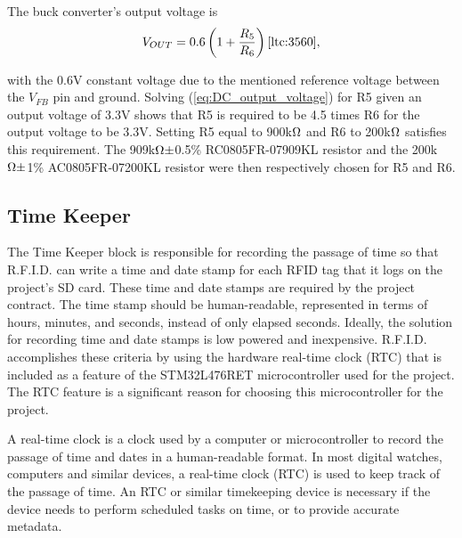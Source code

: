 
The buck converter's output voltage is
\begin{equation}
\label{eq:DC_output_voltage}
    V_{OUT} = 0.6\left(1+\frac{R_{5}}{R_{6}}\right) \cite{ltc:3560},
\end{equation}

with the 0.6V constant voltage due to the mentioned reference voltage between the $V_{FB}$ pin and ground. Solving (\ref{eq:DC_output_voltage}) for R5 given an output voltage of 3.3V shows that R5 is required to be 4.5 times R6 for the output voltage to be 3.3V. Setting R5 equal to 900k$\ohm$ and R6 to 200k$\ohm$ satisfies this requirement. The 909k$\ohm\pm$0.5\% RC0805FR-07909KL resistor and the 200k$\ohm\pm$1\% AC0805FR-07200KL resistor were then respectively chosen for R5 and R6.



\subsection{Time Keeper}
\label{ss:timekeeper}

The Time Keeper block is responsible for recording the passage of time so that R.F.I.D. can write a time and date stamp for each RFID tag that it logs on the project's SD card. These time and date stamps are required by the project contract. The time stamp should be human-readable, represented in terms of hours, minutes, and seconds, instead of only elapsed seconds. Ideally, the solution for recording time and date stamps is low powered and inexpensive. R.F.I.D. accomplishes these criteria by using the hardware real-time clock (RTC) that is included as a feature of the STM32L476RET microcontroller used for the project. The RTC feature is a significant reason for choosing this microcontroller for the project. 

A real-time clock is a clock used by a computer or microcontroller to record the passage of time and dates in a human-readable format. In most digital watches, computers and similar devices, a real-time clock (RTC) is used to keep track of the passage of time. An RTC or similar timekeeping device is necessary if the device needs to perform scheduled tasks on time, or to provide accurate metadata.

